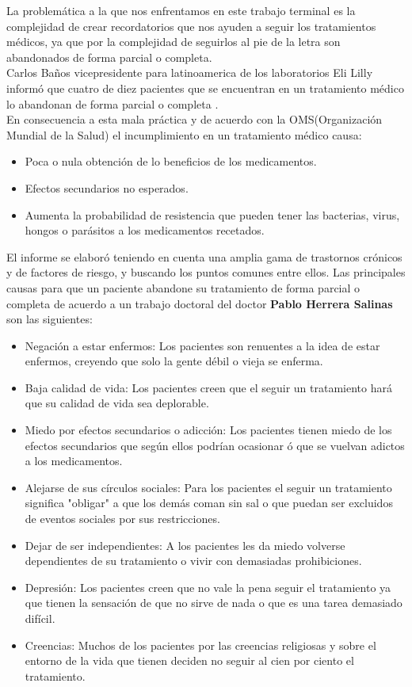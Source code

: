 La problemática a la que nos enfrentamos en este trabajo terminal es la complejidad de crear recordatorios que nos ayuden a seguir los tratamientos médicos, ya que por la complejidad de seguirlos al pie de la letra son abandonados de forma parcial o completa.\\
Carlos Baños vicepresidente para latinoamerica de los laboratorios Eli Lilly informó que cuatro de diez pacientes que se encuentran en un tratamiento médico lo abandonan de forma parcial o completa \cite{Referencia13}.\\
En consecuencia a esta mala práctica y de acuerdo con la OMS(Organización Mundial de la Salud)\cite{Referencia14} el incumplimiento en un tratamiento médico causa:
\begin{itemize}
	\item Poca o nula obtención de lo beneficios de los medicamentos.
	\item Efectos secundarios no esperados.
	\item Aumenta la probabilidad de resistencia que pueden tener las bacterias, virus, hongos o parásitos a los medicamentos recetados.
\end{itemize}
El informe se elaboró teniendo en cuenta una amplia gama de trastornos crónicos y de factores de riesgo, y buscando los puntos comunes entre ellos\cite{Referencia15}.
Las principales causas para que un paciente abandone su tratamiento de forma parcial o completa de acuerdo a un trabajo doctoral del doctor \textbf{Pablo Herrera Salinas}\cite{Referencia19} son las siguientes:
\begin{itemize}
	\item Negación a estar enfermos: Los pacientes son renuentes a la idea de estar enfermos, creyendo que solo la gente débil o vieja se enferma.
	\item Baja calidad de vida: Los pacientes creen que el seguir un tratamiento hará que su calidad de vida sea deplorable.
	\item Miedo por efectos secundarios o adicción: Los pacientes tienen miedo de los efectos secundarios que según ellos podrían ocasionar ó que se vuelvan adictos a los medicamentos.
	\item Alejarse de sus círculos sociales: Para los pacientes el seguir un tratamiento significa "obligar" a que los demás coman sin sal o que puedan ser excluidos de eventos sociales por sus restricciones.
	\item Dejar de ser independientes: A los pacientes les da miedo volverse dependientes de su tratamiento o vivir con demasiadas prohibiciones.
	\item Depresión: Los pacientes creen que no vale la pena seguir el tratamiento ya que tienen la sensación de que no sirve de nada o que es una tarea demasiado difícil.
	\item Creencias: Muchos de los pacientes por las creencias religiosas y sobre el entorno de la vida que tienen deciden no seguir al cien por ciento el tratamiento.
\end{itemize}

